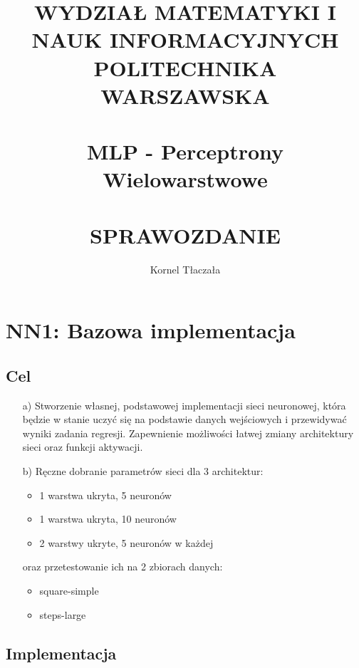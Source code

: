 \documentclass{article}
\begin{document}
\title{
\large WYDZIAŁ MATEMATYKI I NAUK INFORMACYJNYCH \\
\large POLITECHNIKA WARSZAWSKA\\
\hrulefill \\
\LARGE MLP - Perceptrony Wielowarstwowe\\
\hrulefill \\
\large SPRAWOZDANIE}
\author{Kornel Tłaczała}

\maketitle
\tableofcontents
\newpage
\section*{NN1: Bazowa implementacja}
\subsection*{Cel}
\begin{enumerate}
    \item[a)] Stworzenie własnej, podstawowej implementacji sieci neuronowej, która będzie w stanie uczyć się na podstawie danych wejściowych i przewidywać wyniki zadania regresji. Zapewnienie możliwości łatwej zmiany architektury sieci oraz funkcji aktywacji.
    \item[b)] Ręczne dobranie parametrów sieci dla 3 architektur:
    \begin{itemize}
        \item 1 warstwa ukryta, 5 neuronów
        \item 1 warstwa ukryta, 10 neuronów
        \item 2 warstwy ukryte, 5 neuronów w każdej
    \end{itemize}
    oraz przetestowanie ich na 2 zbiorach danych:
    \begin{itemize}
        \item square-simple
        \item steps-large
    \end{itemize}
\end{enumerate}
\subsection*{Implementacja}
\end{document}
